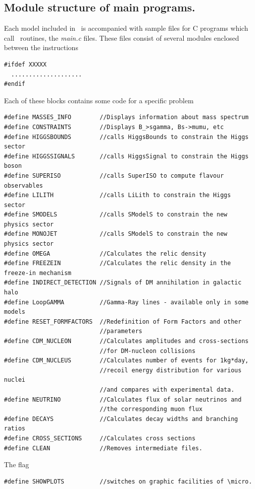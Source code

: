 \documentclass[12pt,a4paper]{article}
\begin{document}
\subsection{Module structure of main programs.}
Each model included in \micro\  is accompanied with sample files for
C  programs which call \micro\ routines, the {\it main.c}  files.  
These files   consist of
several modules enclosed between the instructions
\begin{verbatim}
#ifdef XXXXX
  ....................
#endif
\end{verbatim}
Each of these blocks  contains some code for a specific problem
{\small
\begin{verbatim}
#define MASSES_INFO        //Displays information about mass spectrum 
#define CONSTRAINTS        //Displays B_>sgamma, Bs->mumu, etc
#define HIGGSBOUNDS        //calls HiggsBounds to constrain the Higgs sector
#define HIGGSSIGNALS       //calls HiggsSignal to constrain the Higgs boson
#define SUPERISO           //calls SuperISO to compute flavour observables
#define LILITH             //calls LiLith to constrain the Higgs sector
#define SMODELS            //calls SModelS to constrain the new physics sector
#define MONOJET            //calls SModelS to constrain the new physics sector
#define OMEGA              //Calculates the relic density 
#define FREEZEIN           //Calculates the relic density in the freeze-in mechanism
#define INDIRECT_DETECTION //Signals of DM annihilation in galactic halo
#define LoopGAMMA          //Gamma-Ray lines - available only in some models
#define RESET_FORMFACTORS  //Redefinition of Form Factors and other
                           //parameters 
#define CDM_NUCLEON        //Calculates amplitudes and cross-sections
                           //for DM-nucleon collisions 
#define CDM_NUCLEUS        //Calculates number of events for 1kg*day,
                           //recoil energy distribution for various nuclei
                           //and compares with experimental data.
#define NEUTRINO           //Calculates flux of solar neutrinos and
                           //the corresponding muon flux 
#define DECAYS             //Calculates decay widths and branching ratios  
#define CROSS_SECTIONS     //Calculates cross sections 
#define CLEAN              //Removes intermediate files.
\end{verbatim}
}

The  flag \\

\begin{verbatim}
#define SHOWPLOTS          //switches on graphic facilities of \micro.
\end{verbatim}
\end{document}

